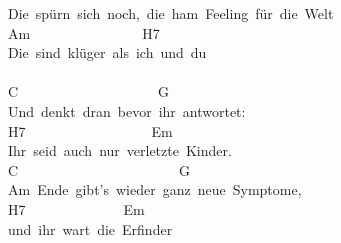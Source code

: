 \documentclass[]{book}
\begin{document}
Die~spürn~sich~noch,~die~ham~Feeling~für~die~Welt\\
\hspace*{0.333em}\hspace*{0.333em}\hspace*{0.333em}\hspace*{0.333em}\hspace*{0.333em}\hspace*{0.333em}\hspace*{0.333em}\hspace*{0.333em}\hspace*{0.333em}\hspace*{0.333em}Am~~~~~~~~~~~~~~~~H7\\
Die~sind~klüger~als~ich~und~du\\
~\\
\hspace*{0.333em}\hspace*{0.333em}\hspace*{0.333em}\hspace*{0.333em}\hspace*{0.333em}C~~~~~~~~~~~~~~~~~~~~G\\
Und~denkt~dran~bevor~ihr~antwortet:\\
\hspace*{0.333em}\hspace*{0.333em}\hspace*{0.333em}\hspace*{0.333em}\hspace*{0.333em}\hspace*{0.333em}\hspace*{0.333em}\hspace*{0.333em}\hspace*{0.333em}H7~~~~~~~~~~~~~~~~~~Em\\
Ihr~seid~auch~nur~verletzte~Kinder.\\
\hspace*{0.333em}\hspace*{0.333em}\hspace*{0.333em}\hspace*{0.333em}C~~~~~~~~~~~~~~~~~~~~~~~G\\
Am~Ende~gibt's~wieder~ganz~neue~Symptome,\\
\hspace*{0.333em}\hspace*{0.333em}\hspace*{0.333em}\hspace*{0.333em}H7~~~~~~~~~~~~~~Em\\
und~ihr~wart~die~Erfinder\\
\end{document}
